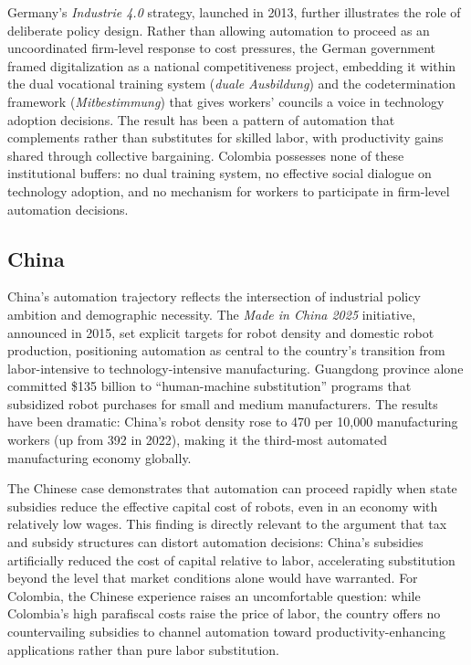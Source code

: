 \documentclass{article}
\begin{document}
Germany's \textit{Industrie 4.0} strategy, launched in 2013, further illustrates the role of deliberate policy design. Rather than allowing automation to proceed as an uncoordinated firm-level response to cost pressures, the German government framed digitalization as a national competitiveness project, embedding it within the dual vocational training system (\textit{duale Ausbildung}) and the codetermination framework (\textit{Mitbestimmung}) that gives workers' councils a voice in technology adoption decisions. The result has been a pattern of automation that complements rather than substitutes for skilled labor, with productivity gains shared through collective bargaining. Colombia possesses none of these institutional buffers: no dual training system, no effective social dialogue on technology adoption, and no mechanism for workers to participate in firm-level automation decisions.

\subsection{China}
\label{subsec:china}

China's automation trajectory reflects the intersection of industrial policy ambition and demographic necessity. The \textit{Made in China 2025} initiative, announced in 2015, set explicit targets for robot density and domestic robot production, positioning automation as central to the country's transition from labor-intensive to technology-intensive manufacturing. Guangdong province alone committed \$135 billion to ``human-machine substitution'' programs that subsidized robot purchases for small and medium manufacturers. The results have been dramatic: China's robot density rose to 470 per 10,000 manufacturing workers (up from 392 in 2022), making it the third-most automated manufacturing economy globally.

The Chinese case demonstrates that automation can proceed rapidly when state subsidies reduce the effective capital cost of robots, even in an economy with relatively low wages. This finding is directly relevant to the \cite{acemoglu2020taxes} argument that tax and subsidy structures can distort automation decisions: China's subsidies artificially reduced the cost of capital relative to labor, accelerating substitution beyond the level that market conditions alone would have warranted. For Colombia, the Chinese experience raises an uncomfortable question: while Colombia's high parafiscal costs raise the price of labor, the country offers no countervailing subsidies to channel automation toward productivity-enhancing applications rather than pure labor substitution.
\end{document}

